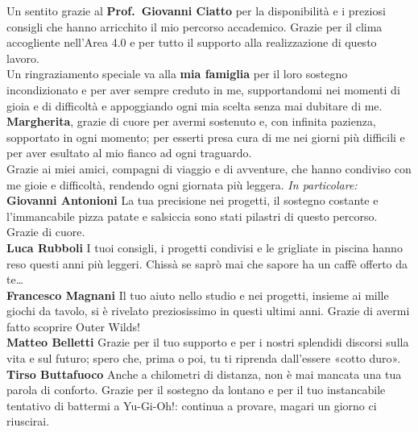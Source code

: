 \documentclass[12pt,a4paper,openright,twoside]{book}
\begin{document}

\backmatter

\nocite{*} %




\begin{acknowledgements} %

Un sentito grazie al \textbf{Prof.\ Giovanni Ciatto} per la disponibilità e i preziosi consigli che hanno arricchito il mio percorso accademico.  
Grazie per il clima accogliente nell’Area 4.0 e per tutto il supporto alla realizzazione di questo lavoro.
\\
Un ringraziamento speciale va alla \textbf{mia famiglia} per il loro sostegno incondizionato e per aver sempre creduto in me,  
supportandomi nei momenti di gioia e di difficoltà e appoggiando ogni mia scelta senza mai dubitare di me.
\\
\textbf{Margherita}, grazie di cuore per avermi sostenuto e, con infinita pazienza, sopportato in ogni momento; per esserti presa cura di me nei giorni più difficili e per aver esultato al mio fianco ad ogni traguardo.
\\
Grazie ai miei amici, compagni di viaggio e di avventure, che hanno condiviso con me gioie e difficoltà, rendendo ogni giornata più leggera.
\textit{In particolare:}
\\
\textbf{Giovanni Antonioni}
La tua precisione nei progetti, il sostegno costante e l’immancabile pizza patate e salsiccia sono stati pilastri di questo percorso. Grazie di cuore.
\\
\textbf{Luca Rubboli}
I tuoi consigli, i progetti condivisi e le grigliate in piscina hanno reso questi anni più leggeri. Chissà se saprò mai che sapore ha un caffè offerto da te\dots
\\
\textbf{Francesco Magnani}
Il tuo aiuto nello studio e nei progetti, insieme ai mille giochi da tavolo, si è rivelato preziosissimo in questi ultimi anni. Grazie di avermi fatto scoprire Outer Wilds!
\\
\textbf{Matteo Belletti}
Grazie per il tuo supporto e per i nostri splendidi discorsi sulla vita e sul futuro; spero che, prima o poi, tu ti riprenda dall’essere «cotto duro».
\\
\textbf{Tirso Buttafuoco}
Anche a chilometri di distanza, non è mai mancata una tua parola di conforto. Grazie per il sostegno da lontano e per il tuo instancabile tentativo di battermi a Yu-Gi-Oh!: continua a provare, magari un giorno ci riuscirai.



\end{acknowledgements}
\end{document}
